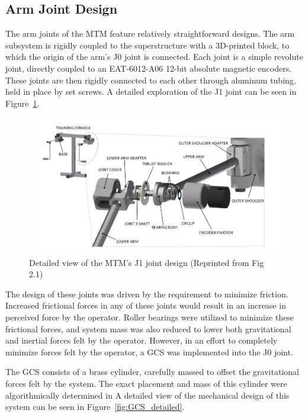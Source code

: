 \subsection{Arm Joint Design}

The arm joints of the MTM feature relatively straightforward designs. The arm subsystem is rigidly coupled to the superstructure with a 3D-printed block, to which the origin of the arm's J0 joint is connected. Each joint is a simple revolute joint, directly coupled to an EAT-6012-A06 12-bit absolute magnetic encoders. These joints are then rigidly connected to each other through aluminum tubing, held in place by set screws. A detailed exploration of the J1 joint can be seen in Figure~\ref{fig:J1_detailed}. 

\begin{figure}[H] 
    \centering
    \includegraphics[width=1.00\linewidth]{figures/J1_detailed.png} 
    \caption{Detailed view of the MTM's J1 joint design (Reprinted from \cite{walder2022design} Fig 2.1)} 
    \label{fig:J1_detailed} 
\end{figure}

The design of these joints was driven by the requirement to minimize friction. Increased frictional forces in any of these joints would result in an increase in perceived force by the operator. Roller bearings were utilized to minimize these frictional forces, and system mass was also reduced to lower both gravitational and inertial forces felt by the operator. However, in an effort to completely minimize forces felt by the operator, a GCS was implemented into the J0 joint.

The GCS consists of a brass cylinder, carefully massed to offset the gravitational forces felt by the system. The exact placement and mass of this cylinder were algorithmically determined in \cite{walder2022design} A detailed view of the mechanical design of this system can be seen in Figure~\ref{fig:GCS_detailed}.

